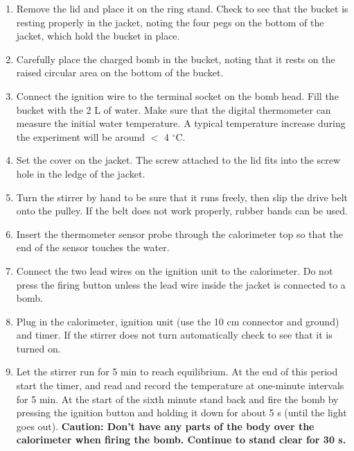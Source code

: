 \documentclass[byrevtex,amssymb,aps,pra,floatfix,letterpaper]{revtex4}
\begin{document}
\begin{enumerate}

\item Remove the lid and place it on the ring stand. Check to see that the bucket is resting properly in the jacket, noting the four pegs on the bottom of the jacket, which hold the bucket in place.

\item Carefully place the charged bomb in the bucket, noting that it rests on the raised circular area on the bottom of the bucket.

\item Connect the ignition wire to the terminal socket on the bomb head. Fill the bucket with the 2 L of water. Make sure that the digital thermometer can measure the initial water temperature. A typical temperature increase during the experiment will be around $<$ 4 $^{\circ}$C.

\item Set the cover on the jacket. The screw attached to the lid fits into the screw hole in the ledge of the jacket.

\item Turn the stirrer by hand to be sure that it runs freely, then slip the drive belt onto the pulley. If the belt does not work properly, rubber bands can be used.

\item Insert the thermometer sensor probe through the calorimeter top so that the end of the sensor touches the water.

\item Connect the two lead wires on the ignition unit to the calorimeter. Do not press the firing button unless the lead wire inside the jacket is connected to a bomb.

\item Plug in the calorimeter, ignition unit (use the 10 cm connector and ground) and timer. If the stirrer does not turn automatically check to see that it is turned on.

\item Let the stirrer run for 5 min to reach equilibrium. At the end of this period start the timer, and read and record the temperature at one-minute intervals for 5 min. At the start of the sixth minute stand back and fire the bomb by pressing the ignition button and holding it down for about 5 s (until the light goes out). \textbf{Caution: Don't have any parts of the body over the calorimeter when firing the bomb. Continue to stand clear for 30 s.}


\end{enumerate}
\end{document}
